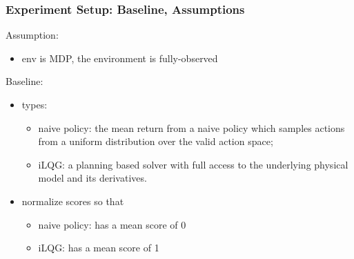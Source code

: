 \begin{frame}
\frametitle{Experiment Setup: Baseline, Assumptions}

Assumption:
\begin{itemize}
  \item env is MDP, the environment is fully-observed
\end{itemize}

Baseline:
\begin{itemize}
  \item types:
  \begin{itemize}
    \item naive policy: the mean return from a naive policy which samples actions from
    a uniform distribution over the valid action space;
    \item iLQG: a planning based solver with full access to
    the underlying physical model and its derivatives.
  \end{itemize}
  \item normalize scores so that
    \begin{itemize}
    \item naive policy: has a mean score of 0
    \item iLQG: has a mean score of 1
  \end{itemize}
\end{itemize}

\end{frame}

